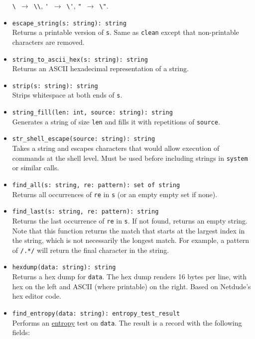 \documentclass[10pt,landscape]{article}
\begin{document}
\begin{multicols*}{2}
\begin{itemize}
    \verb|\|~$\rightarrow$~\verb|\\|,
    \verb|'|~$\rightarrow$~\verb|\'|,
    \verb|"|~$\rightarrow$~\verb|\"|.
  \item \verb|escape_string(s: string): string|\\
    Returns a printable version of \texttt{s}. Same as \texttt{clean} except
    that non-printable characters are removed.
  \item \verb|string_to_ascii_hex(s: string): string|\\
    Returns an ASCII hexadecimal representation of a string.
  \item \verb|strip(s: string): string|\\
    Strips whitespace at both ends of \texttt{s}.
  \item \verb|string_fill(len: int, source: string): string|\\
    Generates a string of size \texttt{len} and fills it with repetitions of
    \texttt{source}.
  \item \verb|str_shell_escape(source: string): string|\\
    Takes a string and escapes characters that would allow execution of
    commands at the shell level. Must be used before including strings in
    \verb|system| or similar calls.
  \item \verb|find_all(s: string, re: pattern): set of string|\\
    Returns all occurrences of \texttt{re} in \texttt{s} (or an empty empty set
    if none).
  \item \verb|find_last(s: string, re: pattern): string|\\
    Returns the last occurrence of \texttt{re} in \texttt{s}. If not found,
    returns an empty string.  Note that this function returns the match that
    starts at the largest index in the string, which is not necessarily the
    longest match.  For example, a pattern of \texttt{/.*/} will return the
    final character in the string.
  \item \verb|hexdump(data: string): string|\\
    Returns a hex dump for \texttt{data}. The hex dump renders 16 bytes per
    line, with hex on the left and ASCII (where printable) on the right. Based
    on Netdude's hex editor code.
  \item \verb|find_entropy(data: string): entropy_test_result|\\
    Performs an \href{http://www.fourmilab.ch/random/}{entropy}
    test on \verb|data|. The result is a record with the following fields:

\end{itemize}
\end{multicols*}
\end{document}
